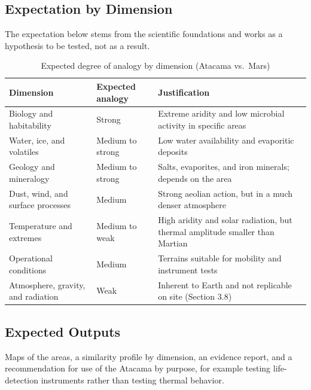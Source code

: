 \documentclass[12pt,letterpaper]{article}
\begin{document}
\subsection{Expectation by Dimension}

The expectation below stems from the scientific foundations and works as a hypothesis to be tested, not as a result.

\begin{table}[htbp]
\centering
\caption{Expected degree of analogy by dimension (Atacama vs.\ Mars)}
\small
\begin{tabularx}{\textwidth}{>{\raggedright\arraybackslash}p{4.4cm} >{\raggedright\arraybackslash}p{3.0cm} >{\raggedright\arraybackslash}X}
\toprule
\textbf{Dimension} & \textbf{Expected analogy} & \textbf{Justification} \\
\midrule
Biology and habitability & Strong & Extreme aridity and low microbial activity in specific areas \\
Water, ice, and volatiles & Medium to strong & Low water availability and evaporitic deposits \\
Geology and mineralogy & Medium to strong & Salts, evaporites, and iron minerals; depends on the area \\
Dust, wind, and surface processes & Medium & Strong aeolian action, but in a much denser atmosphere \\
Temperature and extremes & Medium to weak & High aridity and solar radiation, but thermal amplitude smaller than Martian \\
Operational conditions & Medium & Terrains suitable for mobility and instrument tests \\
Atmosphere, gravity, and radiation & Weak & Inherent to Earth and not replicable on site (Section 3.8) \\
\bottomrule
\end{tabularx}
\end{table}

\subsection{Expected Outputs}

Maps of the areas, a similarity profile by dimension, an evidence report, and a recommendation for use of the Atacama by purpose, for example testing life-detection instruments rather than testing thermal behavior.

\end{document}
